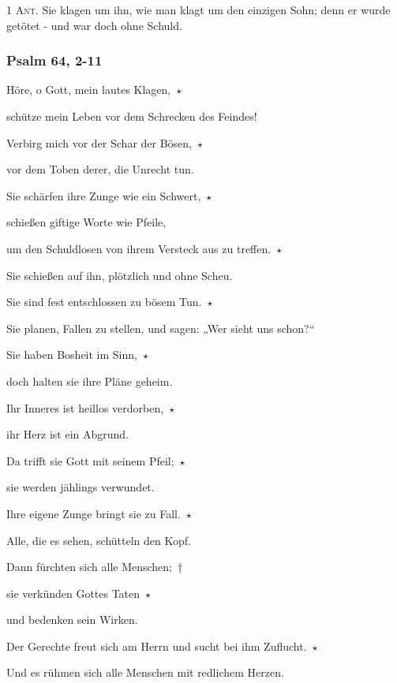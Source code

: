 \noindent \textsc{1 Ant.} Sie klagen um ihn, wie man klagt um den einzigen Sohn; denn er wurde getötet - und war doch ohne Schuld.

\subsubsection{Psalm 64, 2-11}

\noindent Höre, o Gott, mein lautes Klagen,~$\star$~\nopagebreak

schütze mein Leben vor dem Schrecken des Feindes!

\noindent Verbirg mich vor der Schar der Bösen,~$\star$~\nopagebreak

vor dem Toben derer, die Unrecht tun.

\noindent Sie schärfen ihre Zunge wie ein Schwert,~$\star$~\nopagebreak

schießen giftige Worte wie Pfeile,

\noindent um den Schuldlosen von ihrem Versteck aus zu treffen.~$\star$~\nopagebreak

Sie schießen auf ihn, plötzlich und ohne Scheu.

\noindent Sie sind fest entschlossen zu bösem Tun.~$\star$~\nopagebreak

Sie planen, Fallen zu stellen, und sagen: „Wer sieht uns schon?“

\noindent Sie haben Bosheit im Sinn,~$\star$~\nopagebreak

doch halten sie ihre Pläne geheim. 

\noindent Ihr Inneres ist heillos verdorben,~$\star$~\nopagebreak

ihr Herz ist ein Abgrund.

\noindent Da trifft sie Gott mit seinem Pfeil;~$\star$~\nopagebreak

sie werden jählings verwundet.

\noindent Ihre eigene Zunge bringt sie zu Fall.~$\star$~\nopagebreak

Alle, die es sehen, schütteln den Kopf.

\noindent Dann fürchten sich alle Menschen;~†~\nopagebreak

sie verkünden Gottes Taten~$\star$~\nopagebreak

und bedenken sein Wirken.

\noindent Der Gerechte freut sich am Herrn und sucht bei ihm Zuflucht.~$\star$~\nopagebreak

Und es rühmen sich alle Menschen mit redlichem Herzen.

